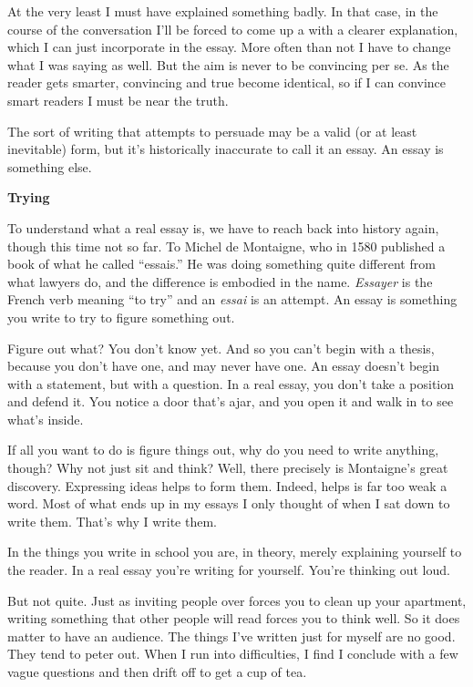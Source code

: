 \documentclass[12pt]{book}
\begin{document}
At the very least I must have explained something badly. In that case,
in the course of the conversation I'll be forced to come up a with a
clearer explanation, which I can just incorporate in the essay. More
often than not I have to change what I was saying as well. But the aim
is never to be convincing per se. As the reader gets smarter, convincing
and true become identical, so if I can convince smart readers I must be
near the truth.

The sort of writing that attempts to persuade may be a valid (or at
least inevitable) form, but it's historically inaccurate to call it an
essay. An essay is something else.

\textbf{Trying}

To understand what a real essay is, we have to reach back into history
again, though this time not so far. To Michel de Montaigne, who in 1580
published a book of what he called ``essais.'' He was doing something
quite different from what lawyers do, and the difference is embodied in
the name. \emph{Essayer} is the French verb meaning ``to try'' and an
\emph{essai} is an attempt. An essay is something you write to try to
figure something out.

Figure out what? You don't know yet. And so you can't begin with a
thesis, because you don't have one, and may never have one. An essay
doesn't begin with a statement, but with a question. In a real essay,
you don't take a position and defend it. You notice a door that's ajar,
and you open it and walk in to see what's inside.

If all you want to do is figure things out, why do you need to write
anything, though? Why not just sit and think? Well, there precisely is
Montaigne's great discovery. Expressing ideas helps to form them.
Indeed, helps is far too weak a word. Most of what ends up in my essays
I only thought of when I sat down to write them. That's why I write
them.

In the things you write in school you are, in theory, merely explaining
yourself to the reader. In a real essay you're writing for yourself.
You're thinking out loud.

But not quite. Just as inviting people over forces you to clean up your
apartment, writing something that other people will read forces you to
think well. So it does matter to have an audience. The things I've
written just for myself are no good. They tend to peter out. When I run
into difficulties, I find I conclude with a few vague questions and then
drift off to get a cup of tea.
\end{document}
